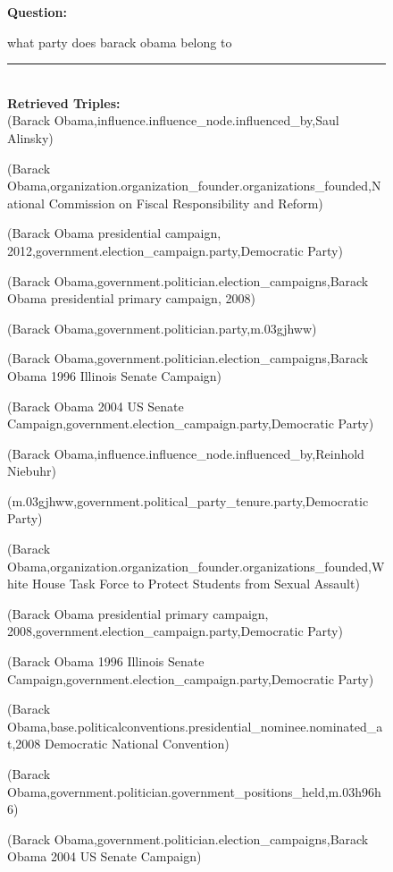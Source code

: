 \begin{figure}
\begin{tcolorbox}[colback=gray!5!white, colframe=gray!75!black, title=WebQSP-WebQTest-760]
\scriptsize

\textbf{Question:}\\
\raggedright what party does barack obama belong to

\rule{\linewidth}{0.4pt}
\\

\textbf{Retrieved Triples:}\\
(Barack Obama,influence.influence\_node.influenced\_by,Saul Alinsky)

(Barack Obama,organization.organization\_founder.organizations\_founded,National Commission on Fiscal Responsibility and Reform)

(Barack Obama presidential campaign, 2012,government.election\_campaign.party,Democratic Party)

(Barack Obama,government.politician.election\_campaigns,Barack Obama presidential primary campaign, 2008)

(Barack Obama,government.politician.party,m.03gjhww)

(Barack Obama,government.politician.election\_campaigns,Barack Obama 1996 Illinois Senate Campaign)

(Barack Obama 2004 US Senate Campaign,government.election\_campaign.party,Democratic Party)

(Barack Obama,influence.influence\_node.influenced\_by,Reinhold Niebuhr)

(m.03gjhww,government.political\_party\_tenure.party,Democratic Party)

(Barack Obama,organization.organization\_founder.organizations\_founded,White House Task Force to Protect Students from Sexual Assault)

(Barack Obama presidential primary campaign, 2008,government.election\_campaign.party,Democratic Party)

(Barack Obama 1996 Illinois Senate Campaign,government.election\_campaign.party,Democratic Party)

(Barack Obama,base.politicalconventions.presidential\_nominee.nominated\_at,2008 Democratic National Convention)

(Barack Obama,government.politician.government\_positions\_held,m.03h96h6)

(Barack Obama,government.politician.election\_campaigns,Barack Obama 2004 US Senate Campaign)


\end{tcolorbox}
\end{figure}
